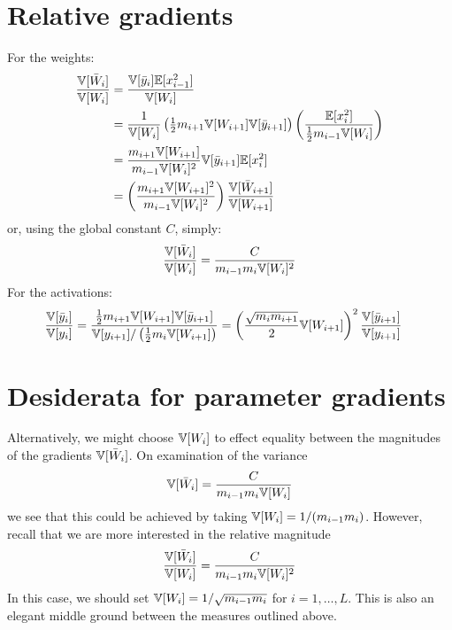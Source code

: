 \section{Relative gradients}

For the weights:
\begin{align}
\frac{\mathbb{V}[\bar{W}_{i}]}{\mathbb{V}[W_{i}]}
& = \frac{\mathbb{V}[\bar{y}_{i}] \mathbb{E}[x_{i-1}^2]}{\mathbb{V}[W_{i}]} \\
& = \frac{1}{\mathbb{V}[W_{i}]} \left( \tfrac{1}{2} m_{i+1} \mathbb{V}[W_{i+1}] \mathbb{V}[\bar{y}_{i+1}] \right) \left( \frac{\mathbb{E}[x_{i}^2]}{\tfrac{1}{2} m_{i - 1} \mathbb{V}[W_{i}]} \right) \\
& = \frac{m_{i+1} \mathbb{V}[W_{i+1}]}{m_{i - 1} \mathbb{V}[W_{i}]^2} \mathbb{V}[\bar{y}_{i+1}] \mathbb{E}[x_{i}^2] \\
& = \left(\frac{m_{i+1} \mathbb{V}[W_{i+1}]^2}{m_{i - 1} \mathbb{V}[W_{i}]^2}\right) \frac{\mathbb{V}[\bar{W}_{i+1}]}{\mathbb{V}[W_{i+1}]}
\end{align}
or, using the global constant $C$, simply:
\begin{align}
\frac{\mathbb{V}[\bar{W}_{i}]}{\mathbb{V}[W_{i}]} = \frac{C}{m_{i-1} m_{i} \mathbb{V}[W_{i}]^2}
\end{align}
For the activations:
\begin{align}
\frac{\mathbb{V}[\bar{y}_{i}]}{\mathbb{V}[y_{i}]}
& = \frac{
  \tfrac{1}{2} m_{i+1} \mathbb{V}[W_{i+1}] \mathbb{V}[\bar{y}_{i+1}]}{
  \mathbb{V}[y_{i+1}] / \left( \tfrac{1}{2} m_{i} \mathbb{V}[W_{i+1}] \right)}
= \left(\frac{\sqrt{m_{i} m_{i+1}}}{2} \mathbb{V}[W_{i+1}]\right)^2 \frac{\mathbb{V}[\bar{y}_{i+1}]}{\mathbb{V}[y_{i+1}]}
\end{align}

\section{Desiderata for parameter gradients}

Alternatively, we might choose $\mathbb{V}[W_{i}]$ to effect equality between the magnitudes of the gradients $\mathbb{V}[\bar{W}_{i}]$.
On examination of the variance
\begin{equation}
\mathbb{V}[\bar{W}_{i}] = \frac{C}{m_{i-1} m_{i} \mathbb{V}[W_{i}]}
\end{equation}
we see that this could be achieved by taking $\mathbb{V}[W_{i}] = 1 / (m_{i-1} m_{i})$.
However, recall that we are more interested in the relative magnitude
\begin{equation}
\frac{\mathbb{V}[\bar{W}_{i}]}{\mathbb{V}[W_{i}]} = \frac{C}{m_{i-1} m_{i} \mathbb{V}[W_{i}]^2}
\end{equation}
In this case, we should set $\mathbb{V}[W_{i}] = 1 / \sqrt{m_{i-1} m_{i}}$ for $i = 1, \dots, L$.
This is also an elegant middle ground between the measures outlined above.

